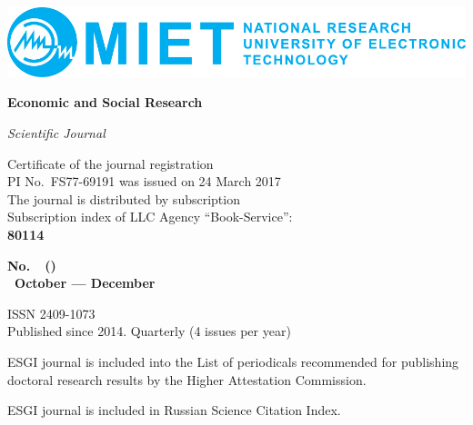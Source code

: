 \begin{center}
  \includegraphics[width=\textwidth]{logo-en}

  {\fontsize{16pt}{20pt}\selectfont\bfseries Economic and Social Research \par}

  {\itshape Scientific Journal}
\end{center}

\noindent
\begin{minipage}{.5\textwidth}
  \small
  Certificate of the journal registration\\
  PI No. FS77-69191 was issued on 24 March 2017\\
  The journal is distributed by subscription\\
  Subscription index of LLC Agency ``Book-Service'':\\
\textbf{80114}
\end{minipage}%
\begin{minipage}{.5\textwidth}
\begin{flushright}
  {\fontsize{16pt}{20pt}\selectfont\bfseries No. \esgiNum~(\esgiNumT)\\
  \esgiYear October — December\par}

  \vspace{5mm}
  \small
  ISSN 2409-1073\\
  Published since 2014. Quarterly (4 issues per year)
\end{flushright}
\end{minipage}

\begin{flushleft}
  \small
  ESGI journal is included into the List of periodicals recommended for publishing doctoral research results by
  the Higher Attestation Commission.

  \vspace{5mm}
  ESGI journal is included in Russian Science Citation Index.
\end{flushleft}

\clearpage
